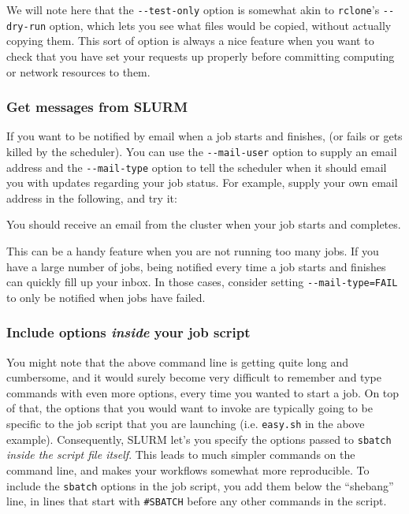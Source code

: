\documentclass[]{krantz}
\makeatletter
\newenvironment{Shaded}{\begin{snugshade}}{\end{snugshade}}
\newcommand{\ExtensionTok}[1]{#1}
\newcommand{\NormalTok}[1]{#1}
\newenvironment{kframe}{%
\medskip{}
\setlength{\fboxsep}{.8em}
 \def\at@end@of@kframe{}%
 \ifinner\ifhmode%
  \def\at@end@of@kframe{\end{minipage}}%
  \begin{minipage}{\columnwidth}%
 \fi\fi%
 \def\FrameCommand##1{\hskip\@totalleftmargin \hskip-\fboxsep
 \colorbox{shadecolor}{##1}\hskip-\fboxsep
     \hskip-\linewidth \hskip-\@totalleftmargin \hskip\columnwidth}%
 \MakeFramed {\advance\hsize-\width
   \@totalleftmargin\z@ \linewidth\hsize
   \@setminipage}}%
 {\par\unskip\endMakeFramed%
 \at@end@of@kframe}
\renewenvironment{Shaded}{\begin{kframe}}{\end{kframe}}
\makeatother
\begin{document}
We will note here that the \texttt{-\/-test-only} option is somewhat akin to \texttt{rclone}'s \texttt{-\/-dry-run}
option, which lets you see what files would be copied, without actually copying them. This
sort of option is always a nice feature when you want to check that you have set your requests
up properly before committing computing or network resources to them.

\hypertarget{get-messages-from-slurm}{%
\subsubsection{Get messages from SLURM}\label{get-messages-from-slurm}}

If you want to be notified by email when a job starts and finishes, (or fails
or gets killed by the scheduler). You can use the \texttt{-\/-mail-user} option to supply
an email address and the \texttt{-\/-mail-type} option to tell the scheduler when it should
email you with updates regarding your job status. For example, supply your own
email address in the following, and try it:

\begin{Shaded}
\end{Shaded}

You should receive an email from the cluster when your job starts and completes.

This can be a handy feature when you are not running too many jobs. If you have a large number
of jobs, being notified
every time a job starts and finishes can quickly fill up your inbox. In those cases, consider
setting \texttt{-\/-mail-type=FAIL} to only be notified when jobs have failed.

\hypertarget{include-options-inside-your-job-script}{%
\subsubsection{\texorpdfstring{Include options \emph{inside} your job script}{Include options inside your job script}}\label{include-options-inside-your-job-script}}

You might note
that the above command line is getting quite long and cumbersome, and it would surely become
very difficult to remember and type commands with even more options, every time you wanted to start a job.
On top of that, the options that you would want to invoke are typically going to be specific to the job
script that you are launching (i.e. \texttt{easy.sh} in the above example). Consequently, SLURM
let's you specify the options passed to \texttt{sbatch} \emph{inside the script file itself}. This leads
to much simpler commands on the command line, and makes your workflows somewhat more reproducible.
To include the \texttt{sbatch} options in the job script, you add them below the ``shebang'' line, in lines
that start with \texttt{\#SBATCH} before any other commands in the script.
\end{document}

